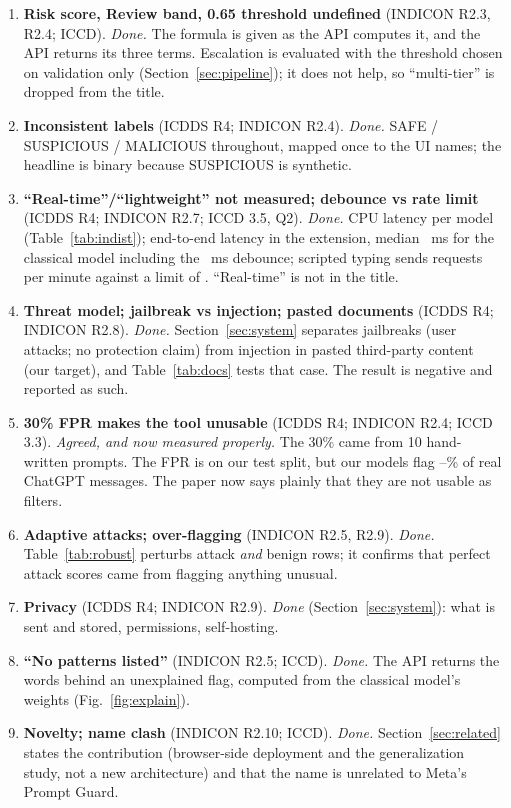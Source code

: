 \begin{enumerate}
model a cross-validated ensemble; it is one model chosen on the validation split. Code and data revisions are released.
\item \textbf{Risk score, Review band, 0.65 threshold undefined} (INDICON R2.3, R2.4; ICCD). \emph{Done.} The
formula is given as the API computes it, and the API returns its three terms. Escalation is evaluated with
the threshold chosen on validation only (Section~\ref{sec:pipeline}); it does not help, so ``multi-tier'' is
dropped from the title.
\item \textbf{Inconsistent labels} (ICDDS R4; INDICON R2.4). \emph{Done.} SAFE / SUSPICIOUS / MALICIOUS
throughout, mapped once to the UI names; the headline is binary because SUSPICIOUS is synthetic.
\item \textbf{``Real-time''/``lightweight'' not measured; debounce vs rate limit} (ICDDS R4; INDICON R2.7; ICCD 3.5,
Q2). \emph{Done.} CPU latency per model (Table~\ref{tab:indist}); end-to-end latency in the extension, median
~ms for the classical model including the
~ms debounce; scripted typing sends
 requests per minute against a limit of
. ``Real-time'' is not in the title.
\item \textbf{Threat model; jailbreak vs injection; pasted documents} (ICDDS R4; INDICON R2.8). \emph{Done.}
Section~\ref{sec:system} separates jailbreaks (user attacks; no protection claim) from injection in pasted
third-party content (our target), and Table~\ref{tab:docs} tests that case. The result is negative and reported as such.
\item \textbf{30\% FPR makes the tool unusable} (ICDDS R4; INDICON R2.4; ICCD 3.3). \emph{Agreed, and now
measured properly.} The 30\% came from 10 hand-written prompts. The FPR is
 on our test split, but our models flag
--\% of real
ChatGPT messages. The paper now says plainly that they are not usable as filters.
\item \textbf{Adaptive attacks; over-flagging} (INDICON R2.5, R2.9). \emph{Done.} Table~\ref{tab:robust} perturbs
attack \emph{and} benign rows; it confirms that perfect attack scores came from flagging anything unusual.
\item \textbf{Privacy} (ICDDS R4; INDICON R2.9). \emph{Done} (Section~\ref{sec:system}): what is sent and stored, permissions, self-hosting.
\item \textbf{``No patterns listed''} (INDICON R2.5; ICCD). \emph{Done.} The API returns the words behind an
unexplained flag, computed from the classical model's weights (Fig.~\ref{fig:explain}).
\item \textbf{Novelty; name clash} (INDICON R2.10; ICCD). \emph{Done.} Section~\ref{sec:related} states the
contribution (browser-side deployment and the generalization study, not a new architecture) and that the name
is unrelated to Meta's Prompt Guard.
\end{enumerate}

